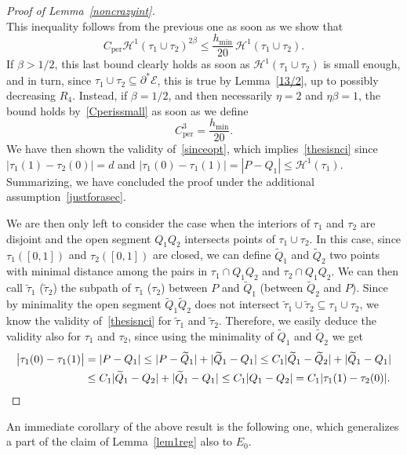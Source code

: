 \documentclass[JEP,XML,SOM,Unicode,NoFloatCountersInSection]{cedram}
\newcommand\Ceeb{C_\mathrm{per}}
\newcommand\E{\mathcal{E}}
\renewcommand\H{\mathcal{H}}
\theoremstyle{plain}
\theoremstyle{definition}
\begin{document}
\begin{proof}[Proof of Lemma~\ref{noncrazyint}]
\begin{equation}
\end{equation}
This inequality follows from the previous one as soon as we show that
\[
\Ceeb \H^1(\tau_1 \cup\tau_2)^{2\beta} \leq \frac{h_{\min}}{20}\,\H^1(\tau_1 \cup\tau_2).
\]
If $\beta>1/2$, this last bound clearly holds as soon as $\H^1(\tau_1 \cup\tau_2)$ is small enough, and in turn, since $\tau_1\cup\tau_2\subseteq\partial^*\E$, this is true by Lemma~\ref{13/2}, up to possibly decreasing $R_4$. Instead, if $\beta=1/2$, and then necessarily $\eta=2$ and $\eta\beta=1$, the bound holds by~\eqref{Cperissmall} as soon as we define
\begin{equation}\label{ceeb3}
\Ceeb^3=\frac{h_{\min}}{20}.
\end{equation}
We have then shown the validity of~\eqref{sinceopt}, which implies~\eqref{thesisnci} since $|\tau_1(1)-\tau_2(0)|=d$ and $|\tau_1(0)-\tau_1(1)|=|P-Q_1|\leq \H^1(\tau_1)$. Summarizing, we have concluded the proof under the additional assumption~\eqref{justforasec}.

We are then only left to consider the case when the interiors of $\tau_1$ and $\tau_2$ are disjoint and the open segment $Q_1Q_2$ intersects points of $\tau_1\cup\tau_2$. In this case, since $\tau_1([0,1])$ and $\tau_2([0,1])$ are closed, we can define $\widetilde Q_1$ and $\widetilde Q_2$ two points with minimal distance among the pairs in $\tau_1\cap Q_1Q_2$ and $\tau_2\cap Q_1Q_2$. We can then call $\tilde \tau_1$ (\resp $\tilde\tau_2$) the subpath of $\tau_1$ (\resp $\tau_2$) between $P$ and $\widetilde Q_1$ (\resp between $\widetilde Q_2$ and $P$). Since by minimality the open segment $\widetilde Q_1\widetilde Q_2$ does not intersect $\tilde\tau_1\cup\tilde\tau_2 \subseteq \tau_1\cup\tau_2$, we know the validity of~\eqref{thesisnci} for $\tilde\tau_1$ and $\tilde\tau_2$. Therefore, we easily deduce the validity also for $\tau_1$ and $\tau_2$, since using the minimality of $\widetilde Q_1$ and $\widetilde Q_2$ we get
\begin{align*}
\big|\tau_1(0)-\tau_1(1)\big| &= |P-Q_1|
\leq |P-\widetilde Q_1| + |\widetilde Q_1 - Q_1|
\leq C_1 |\widetilde Q_1 - \widetilde Q_2 | + |\widetilde Q_1 - Q_1|\\
&\leq C_1 |\widetilde Q_1 - Q_2 | + |\widetilde Q_1 - Q_1|
\leq
C_1 |Q_1-Q_2| = C_1 |\tau_1(1)-\tau_2(0)|.\qedhere
\end{align*}
\end{proof}

An immediate corollary of the above result is the following one, which generalizes a part of the claim of Lemma~\ref{lem1reg} also to $E_0$.
\end{document}
